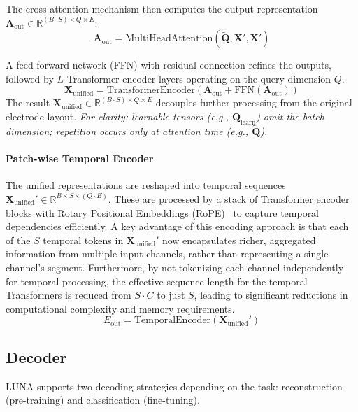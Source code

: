 The cross-attention mechanism then computes the output representation \( \mathbf{A}_{\text{out}} \in \mathbb{R}^{(B \cdot S) \times Q \times E} \):
\begin{equation}
    \mathbf{A}_{\text{out}} = \text{MultiHeadAttention}(\tilde{\mathbf{Q}}, \mathbf{X}', \mathbf{X}')
\end{equation}


A feed-forward network (FFN) with residual connection refines the outputs, followed by $L$ Transformer encoder layers operating on the query dimension $Q$.
\begin{equation}
    \mathbf{X}_{\text{unified}} = \text{TransformerEncoder}(\mathbf{A}_{\text{out}} + \text{FFN}(\mathbf{A}_{\text{out}}))
\end{equation}
The result \( \mathbf{X}_{\text{unified}} \in \mathbb{R}^{(B \cdot S) \times Q \times E} \) decouples further processing from the original electrode layout.  \textit{For clarity: learnable tensors (e.g., $\mathbf{Q}_{\text{learn}}$) omit the batch dimension; repetition occurs only at attention time (e.g., $\tilde{\mathbf{Q}}$).} 

\paragraph{Patch-wise Temporal Encoder}
\label{subsubsec:temporal_encoder}

The unified representations are reshaped into temporal sequences \( \mathbf{X}_{\text{unified}}' \in \mathbb{R}^{B \times S \times (Q \cdot E)} \). These are processed by a stack of Transformer encoder blocks with Rotary Positional Embeddings (RoPE)~\citep{su2024roformer} to capture temporal dependencies efficiently. A key advantage of this encoding approach is that each of the \(S\) temporal tokens in \(\mathbf{X}_{\text{unified}}'\) now encapsulates richer, aggregated information from multiple input channels, rather than representing a single channel's segment. Furthermore, by not tokenizing each channel independently for temporal processing, the effective sequence length for the temporal Transformers is reduced from \(S \cdot C\) to just \(S\), leading to significant reductions in computational complexity and memory requirements. $$E_{\text{out}} = \text{TemporalEncoder}(\mathbf{X}_{\text{unified}}')$$

\subsection{Decoder}
\label{subsec:decoder}
LUNA supports two decoding strategies depending on the task: reconstruction (pre-training) and classification (fine-tuning).


